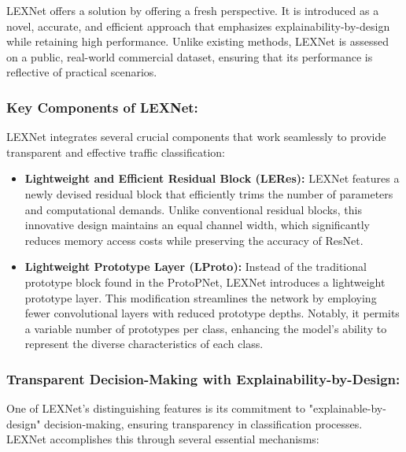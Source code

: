 \documentclass{article}
\begin{document}
LEXNet offers a solution by offering a fresh perspective. It is introduced as a novel, accurate, and efficient approach that emphasizes explainability-by-design while retaining high performance. Unlike existing methods, LEXNet is assessed on a public, real-world commercial dataset, ensuring that its performance is reflective of practical scenarios.

\subsubsection{Key Components of LEXNet:}

LEXNet integrates several crucial components that work seamlessly to provide transparent and effective traffic classification:

\begin{itemize}
    \item \textbf{Lightweight and Efficient Residual Block (LERes):} LEXNet features a newly devised residual block that efficiently trims the number of parameters and computational demands. Unlike conventional residual blocks, this innovative design maintains an equal channel width, which significantly reduces memory access costs while preserving the accuracy of ResNet.
    \item \textbf{Lightweight Prototype Layer (LProto):} Instead of the traditional prototype block found in the ProtoPNet, LEXNet introduces a lightweight prototype layer. This modification streamlines the network by employing fewer convolutional layers with reduced prototype depths. Notably, it permits a variable number of prototypes per class, enhancing the model's ability to represent the diverse characteristics of each class.

\end{itemize}

\subsubsection{Transparent Decision-Making with Explainability-by-Design:}

One of LEXNet's distinguishing features is its commitment to "explainable-by-design" decision-making, ensuring transparency in classification processes. LEXNet accomplishes this through several essential mechanisms:
\end{document}
